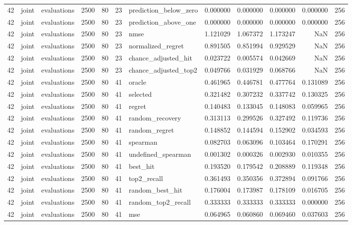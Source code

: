 \begin{tabular}{rllrrrlrrrrr}
42 & joint & evaluations & 2500 & 80 & 23 & prediction_below_zero & 0.000000 & 0.000000 & 0.000000 & 0.000000 & 256 \\
42 & joint & evaluations & 2500 & 80 & 23 & prediction_above_one & 0.000000 & 0.000000 & 0.000000 & 0.000000 & 256 \\
42 & joint & evaluations & 2500 & 80 & 23 & nmse & 1.121029 & 1.067372 & 1.173247 & NaN & 256 \\
42 & joint & evaluations & 2500 & 80 & 23 & normalized_regret & 0.891505 & 0.851994 & 0.929529 & NaN & 256 \\
42 & joint & evaluations & 2500 & 80 & 23 & chance_adjusted_hit & 0.023722 & 0.005574 & 0.042669 & NaN & 256 \\
42 & joint & evaluations & 2500 & 80 & 23 & chance_adjusted_top2 & 0.049766 & 0.031929 & 0.068766 & NaN & 256 \\
42 & joint & evaluations & 2500 & 80 & 41 & oracle & 0.461965 & 0.446781 & 0.477764 & 0.131089 & 256 \\
42 & joint & evaluations & 2500 & 80 & 41 & selected & 0.321482 & 0.307232 & 0.337742 & 0.130325 & 256 \\
42 & joint & evaluations & 2500 & 80 & 41 & regret & 0.140483 & 0.133045 & 0.148083 & 0.059965 & 256 \\
42 & joint & evaluations & 2500 & 80 & 41 & random_recovery & 0.313113 & 0.299526 & 0.327492 & 0.119736 & 256 \\
42 & joint & evaluations & 2500 & 80 & 41 & random_regret & 0.148852 & 0.144594 & 0.152902 & 0.034593 & 256 \\
42 & joint & evaluations & 2500 & 80 & 41 & spearman & 0.082703 & 0.063096 & 0.103464 & 0.170291 & 256 \\
42 & joint & evaluations & 2500 & 80 & 41 & undefined_spearman & 0.001302 & 0.000326 & 0.002930 & 0.010355 & 256 \\
42 & joint & evaluations & 2500 & 80 & 41 & best_hit & 0.193520 & 0.179542 & 0.208889 & 0.119348 & 256 \\
42 & joint & evaluations & 2500 & 80 & 41 & top2_recall & 0.361493 & 0.350356 & 0.372894 & 0.091766 & 256 \\
42 & joint & evaluations & 2500 & 80 & 41 & random_best_hit & 0.176004 & 0.173987 & 0.178109 & 0.016705 & 256 \\
42 & joint & evaluations & 2500 & 80 & 41 & random_top2_recall & 0.333333 & 0.333333 & 0.333333 & 0.000000 & 256 \\
42 & joint & evaluations & 2500 & 80 & 41 & mse & 0.064965 & 0.060860 & 0.069460 & 0.037603 & 256 \\

\end{tabular}
